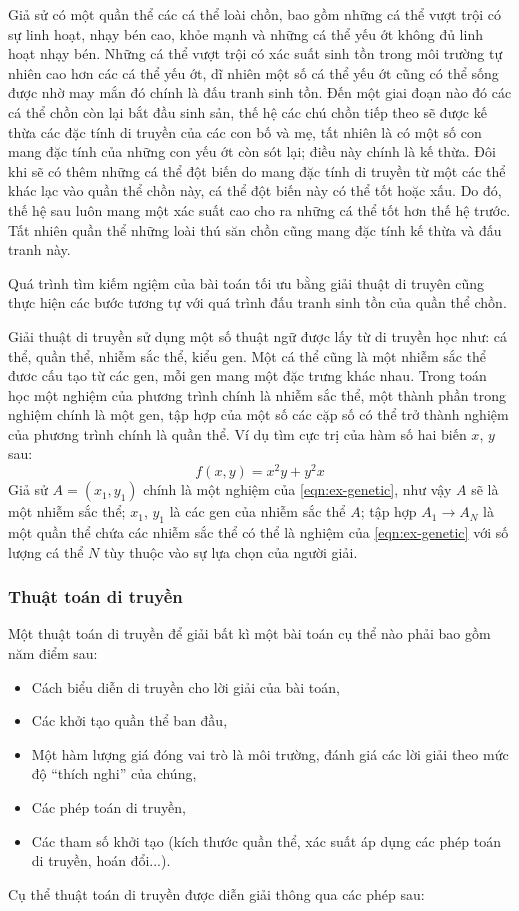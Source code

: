 \documentclass[12pt,a4paper]{report}
\begin{document}
Giả sử có một quần thể các cá thể loài chồn, bao gồm những cá thể vượt trội có sự linh hoạt, nhạy bén cao, khỏe mạnh và những cá thể yếu ớt không đủ linh hoạt nhạy bén. Những cá thể vượt trội có xác suất sinh tồn trong môi trường tự nhiên cao hơn các cá thể yếu ớt, dĩ nhiên một số cá thể yếu ớt cũng có thể sống được nhờ may mắn đó chính là đấu tranh sinh tồn. Đến một giai đoạn nào đó các cá thể chồn còn lại bắt đầu sinh sản, thế hệ các chú chồn tiếp theo sẽ được kế thừa các đặc tính di truyền của các con bố và mẹ, tất nhiên là có một số con mang đặc tính của những con yếu ớt còn sót lại; điều này chính là kế thừa. Đôi khi sẽ có thêm những cá thể đột biến do mang đặc tính di truyền từ một các thể khác lạc vào quần thể chồn này, cá thể đột biến này có thể tốt hoặc xấu. Do đó, thế hệ sau luôn mang một xác suất cao cho ra những cá thể tốt hơn thế hệ trước. Tất nhiên quần thể những loài thú săn chồn cũng mang đặc tính kế thừa và đấu tranh này.

Quá trình tìm kiếm ngiệm của bài toán tối ưu bằng giải thuật di truyên cũng thực hiện các bước tương tự với quá trình đấu tranh sinh tồn của quần thể chồn. 

Giải thuật di truyền sử dụng một số thuật ngữ được lấy từ di truyền học như: cá thể, quần thể, nhiễm sắc thể, kiểu gen. Một cá thể cũng là một nhiễm sắc thể đươc cấu tạo từ các gen, mỗi gen mang một đặc trưng khác nhau. Trong toán học một nghiệm của phương trình chính là nhiễm sắc thể, một thành phần trong nghiệm chính là một gen, tập hợp của một số các cặp số có thể trở thành nghiệm của phương trình chính là quần thể. Ví dụ tìm cực trị của hàm số hai biến $x$, $y$ sau:
	\begin{equation}\label{eqn:ex-genetic}
		f(x, y) = x^2y + y^2x
	\end{equation}
Giả sử $A = (x_1, y_1)$ chính là một nghiệm của \ref{eqn:ex-genetic}, như vậy $A$ sẽ là một nhiễm sắc thể; $x_1$, $y_1$ là các gen của nhiễm sắc thể $A$; tập hợp $A_1 \to A_N$ là một quần thể chứa các nhiễm sắc thể có thể là nghiệm của \ref{eqn:ex-genetic} với số lượng cá thể $N$ tùy thuộc vào sự lựa chọn của người giải.\\

\subsubsection{Thuật toán di truyền}
Một thuật toán di truyền để giải bất kì một bài toán cụ thể nào phải bao gồm năm điểm sau:
	\begin{itemize}
		\item Cách biểu diễn di truyền cho lời giải của bài toán,
		\item Các khởi tạo quần thể ban đầu,
		\item Một hàm lượng giá đóng vai trò là môi trường, đánh giá các lời giải theo mức độ ``thích nghi'' của chúng,
		\item Các phép toán di truyền,
		\item Các tham số khởi tạo (kích thước quần thể, xác suất áp dụng các phép toán di truyền, hoán đổi...).
	\end{itemize}
Cụ thể thuật toán di truyền được diễn giải thông qua các phép sau:
\end{document}
